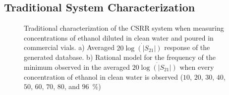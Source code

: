 \documentclass[journal,twoside,web]{ieeecolor}
\begin{document}
\subsection{Traditional System Characterization}
\label{ssec:sysCharac}
\begin{figure}[!t]
	\centering
	\caption{Traditional characterization of the CSRR system when measuring concentrations of ethanol diluted in clean water and poured in commercial vials. a) Averaged $20\dot{\log\left(|S_{21}|\right)}$ response of the generated database. b) Rational model for the frequency of the minimum observed in the averaged $20\dot{\log\left(|S_{21}|\right)}$ when every concentration of ethanol in clean water is observed ($10$, $20$, $30$, $40$, $50$, $60$, $70$, $80$, and $96$~$\%$)}
	\label{fig:avgData}
\end{figure}
\end{document}
